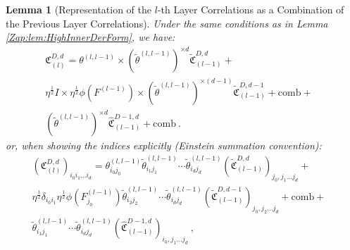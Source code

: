 \documentclass{article} %
\newtheorem{lemma}[theorem]{Lemma}
\begin{document}
\begin{lemma}[Representation of the \(l\)-th Layer Correlations as a Combination of the Previous Layer Correlations]
\label{Zap:lem:HighInnercorForm}
\textup
{Under the same conditions as in Lemma \ref{Zap:lem:HighInnerDerForm}, we have:
\begin{equation}
\begin{array}{c}
\mathfrak{C}_{\left(l\right)}^{D,d}=\theta^{\left(l,l-1\right)}\times\left(\tilde{\theta}^{\left(l,l-1\right)}\right)^{\times d}\tilde{\mathfrak{C}}_{\left(l-1\right)}^{D,d}+\\
\eta^{\frac{1}{2}}I\times\eta^{\frac{1}{2}}\phi\left(F^{(l-1)}\right)\times\left(\tilde{\theta}^{\left(l,l-1\right)}\right)^{\times (d-1)}\tilde{\mathfrak{C}}_{\left(l-1\right)}^{D,d-1}+\text{comb}+\begin{array}{c}
\\
\\
\end{array}\\
\left(\tilde{\theta}^{\left(l,l-1\right)}\right)^{\times d}\hat{\mathfrak{C}}_{\left(l-1\right)}^{D-1,d}+\text{comb} \ .
\end{array}
\end{equation}
or, when showing the indices explicitly (Einstein summation convention):
\begin{equation}
\begin{array}{c}
\left(\mathfrak{C}_{\left(l\right)}^{D,d}\right)_{i_{0}i_{1}\ldots i_{d}}=\theta_{i_{0}j_{0}}^{\left(l,l-1\right)}\tilde{\theta}_{i_{1}j_{1}}^{\left(l,l-1\right)}\cdots\tilde{\theta}_{i_{d}j_{d}}^{\left(l,l-1\right)}\left(\tilde{\mathfrak{C}}_{\left(l-1\right)}^{D,d}\right)_{j_{0},j_{1}\ldots j_{d}}+\\
\eta^{\frac{1}{2}}\delta_{i_{0}i_{1}}\eta^{\frac{1}{2}}\phi\left(F_{j_{0}}^{\left(l-1\right)}\right)\tilde{\theta}_{i_{2}j_{2}}^{\left(l,l-1\right)}\cdots\tilde{\theta}_{i_{d}j_{d}}^{\left(l,l-1\right)}\left(\tilde{\mathfrak{C}}_{\left(l-1\right)}^{D,d-1}\right)_{j_{0},j_{2}\ldots j_{d}}+\text{comb}+\begin{array}{c}
\\
\\
\end{array}\\
\tilde{\theta}_{i_{1}j_{1}}^{\left(l,l-1\right)}\cdots\tilde{\theta}_{i_{d}j_{d}}^{\left(l,l-1\right)}\left(\hat{\mathfrak{C}}_{\left(l-1\right)}^{D-1,d}\right)_{i_{0},j_{1}\ldots j_{d}} \ ,
\end{array}
\end{equation}
}


\end{lemma}
\end{document}
